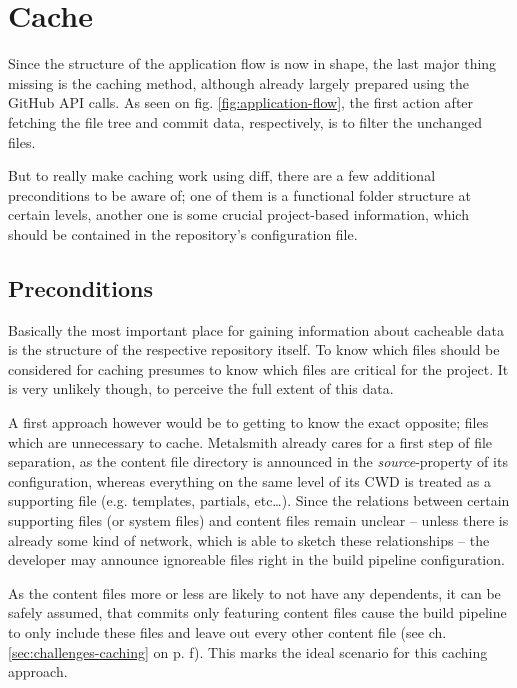 \section{Cache}
\label{sec:implementation-cache}

Since the structure of the application flow is now in shape, the last major thing missing is the caching method, although already largely prepared using the GitHub API calls. As seen on fig. \ref{fig:application-flow}, the first action after fetching the file tree and commit data, respectively, is to filter the unchanged files.

But to really make caching work using diff, there are a few additional preconditions to be aware of; one of them is a functional folder structure at certain levels, another one is some crucial project-based information, which should be contained in the repository's configuration file.

\subsection{Preconditions}
Basically the most important place for gaining information about cacheable data is the structure of the respective repository itself. To know which files should be considered for caching presumes to know which files are critical for the project. It is very unlikely though, to perceive the full extent of this data.

A first approach however would be to getting to know the exact opposite; files which are unnecessary to cache. Metalsmith already cares for a first step of file separation, as the content file directory is announced in the \emph{source}-property of its configuration, whereas everything on the same level of its CWD is treated as a supporting file (e.g. templates, partials, etc\ldots). Since the relations between certain supporting files (or system files) and content files remain unclear -- unless there is already some kind of network, which is able to sketch these relationships -- the developer may announce ignoreable files right in the build pipeline configuration.

As the content files more or less are likely to not have any dependents, it can be safely assumed, that commits only featuring content files cause the build pipeline to only include these files and leave out every other content file (see ch. \ref{sec:challenges-caching} on p. \pageref{sec:challenges-caching}f). This marks the ideal scenario for this caching approach.

